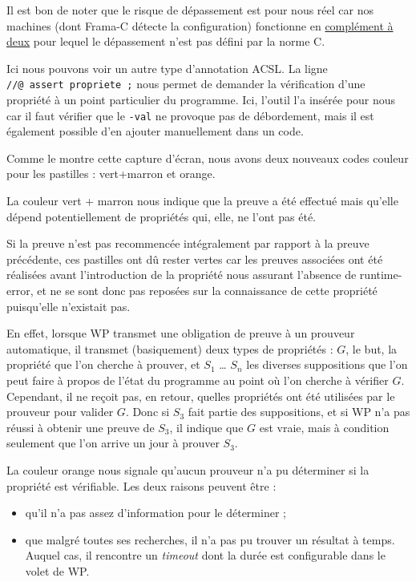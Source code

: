 \documentclass[12pt,francais,]{scrbook}
\providecommand{\tightlist}{%
  \setlength{\itemsep}{0pt}\setlength{\parskip}{0pt}}
\newenvironment{zdsblock}[1]{%
  \tcolorbox[beamer,%
    noparskip,breakable,
    colback=LightBlue,colframe=DarkBlue,%
    colbacklower=DarkBlue,%
    title=#1]
}{\endtcolorbox}
\begin{document}
\begin{zdsblock}{Information}
  Il est bon de noter que le risque de
  dépassement est pour nous réel car nos machines (dont Frama-C
  détecte la configuration) fonctionne en
  \href{https://fr.wikipedia.org/wiki/Compl\%C3\%A9ment_\%C3\%A0_deux}{complément
à deux} pour lequel le dépassement n'est pas défini par la norme C.
\end{zdsblock}

Ici nous pouvons voir un autre type d'annotation ACSL. La ligne
\texttt{//@\ assert\ propriete\ ;} nous permet de demander la
vérification d'une propriété à un point particulier du programme. Ici,
l'outil l'a insérée pour nous car il faut vérifier que le \texttt{-val}
ne provoque pas de débordement, mais il est également possible d'en
ajouter manuellement dans un code.

Comme le montre cette capture d'écran, nous avons deux nouveaux codes
couleur pour les pastilles : vert+marron et orange.

La couleur vert + marron nous indique que la preuve a été effectué mais
qu'elle dépend potentiellement de propriétés qui, elle, ne l'ont pas
été.

Si la preuve n'est pas recommencée intégralement par rapport à la preuve
précédente, ces pastilles ont dû rester vertes car les preuves associées
ont été réalisées avant l'introduction de la propriété nous assurant
l'absence de runtime-error, et ne se sont donc pas reposées sur la
connaissance de cette propriété puisqu'elle n'existait pas.

En effet, lorsque WP transmet une obligation de preuve à un prouveur
automatique, il transmet (basiquement) deux types de propriétés : \(G\),
le but, la propriété que l'on cherche à prouver, et \(S_1\) \ldots{}
\(S_n\) les diverses suppositions que l'on peut faire à propos de l'état
du programme au point où l'on cherche à vérifier \(G\). Cependant, il ne
reçoit pas, en retour, quelles propriétés ont été utilisées par le
prouveur pour valider \(G\). Donc si \(S_3\) fait partie des
suppositions, et si WP n'a pas réussi à obtenir une preuve de \(S_3\),
il indique que \(G\) est vraie, mais à condition seulement que l'on
arrive un jour à prouver \(S_3\).

La couleur orange nous signale qu'aucun prouveur n'a pu déterminer si la
propriété est vérifiable. Les deux raisons peuvent être :

\begin{itemize}
\tightlist
\item
  qu'il n'a pas assez d'information pour le déterminer ;
\item
  que malgré toutes ses recherches, il n'a pas pu trouver un résultat à
  temps. Auquel cas, il rencontre un \emph{timeout} dont la durée est
  configurable dans le volet de WP.
\end{itemize}
\end{document}

